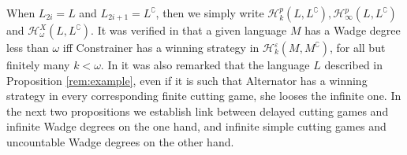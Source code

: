 When $L_{2i}=L$ and $L_{2i+1}=L^\complement$, then we simply write $\mathcal{H}^p_k(L, L^\complement), \mathcal{H}^p_\infty(L, L^\complement)$ and  $\mathcal{H}^{X}_\omega(L, L^\complement)$.
It was verified in \cite{bp} that a given language $M$ has a Wadge degree less than $\omega$ iff Constrainer has a winning strategy in $\mathcal{H}^\varepsilon_k(M, M^\complement)$, for all but finitely many $k<\omega$.
In \cite{bp} it was also remarked that the language $L$ described in Proposition \ref{rem:example}, even  if it is such that Alternator has a winning strategy in every corresponding finite cutting game, she looses the infinite one.
In the next two propositions we establish link between delayed cutting games and infinite Wadge degrees on the one hand, and infinite simple cutting games and uncountable Wadge degrees on the other hand.


